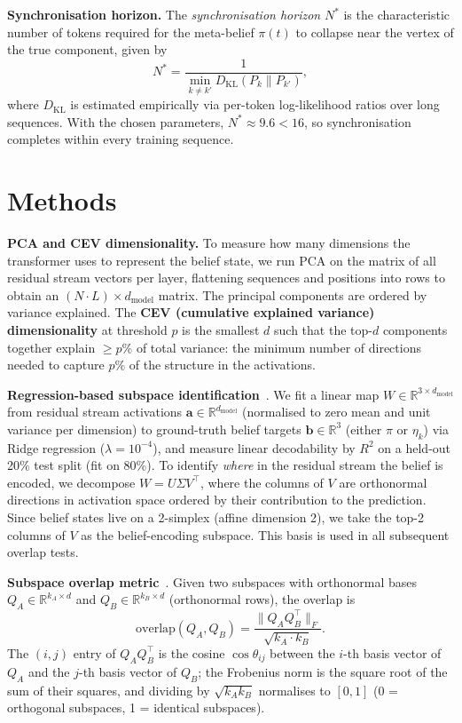 \documentclass{article}
\begin{document}
\textbf{Synchronisation horizon.}
The \emph{synchronisation horizon} $N^*$ is the characteristic number of
tokens required for the meta-belief $\pi(t)$ to collapse near the vertex of
the true component, given by
\[
N^* = \frac{1}{\min_{k \neq k'} D_\mathrm{KL}(P_k \| P_{k'})},
\]
where $D_\mathrm{KL}$ is estimated empirically via per-token log-likelihood
ratios over long sequences.
With the chosen parameters, $N^* \approx 9.6 < 16$, so synchronisation
completes within every training sequence.

\section{Methods}
\label{sec:methods}

\textbf{PCA and CEV dimensionality.}
To measure how many dimensions the transformer uses to represent the belief state,
we run PCA on the matrix of all residual stream vectors per layer, flattening
sequences and positions into rows to obtain an $(N \cdot L) \times d_\mathrm{model}$
matrix.
The principal components are ordered by variance explained.
The \textbf{CEV (cumulative explained variance) dimensionality} at threshold $p$ is
the smallest $d$ such that the top-$d$ components together explain $\geq p\%$ of
total variance: the minimum number of directions needed to capture $p\%$ of the
structure in the activations.

\textbf{Regression-based subspace identification}~\cite{shai2024belief}.
We fit a linear map $W \in \mathbb{R}^{3 \times d_\mathrm{model}}$ from residual
stream activations $\mathbf{a} \in \mathbb{R}^{d_\mathrm{model}}$ (normalised to
zero mean and unit variance per dimension) to ground-truth belief targets
$\mathbf{b} \in \mathbb{R}^3$ (either $\pi$ or $\eta_k$) via Ridge regression
($\lambda = 10^{-4}$), and measure linear decodability by $R^2$ on a held-out
20\% test split (fit on 80\%).
To identify \emph{where} in the residual stream the belief is encoded, we decompose $W = U\Sigma V^\top$, where the columns of $V$ are orthonormal directions
in activation space ordered by their contribution to the prediction.
Since belief states live on a 2-simplex (affine dimension 2), we take the top-2
columns of $V$ as the belief-encoding subspace.
This basis is used in all subsequent overlap tests.

\textbf{Subspace overlap metric}~\cite{shai2025factored}.
Given two subspaces with orthonormal bases $Q_A \in \mathbb{R}^{k_A \times d}$ and
$Q_B \in \mathbb{R}^{k_B \times d}$ (orthonormal rows), the overlap is
\[
  \mathrm{overlap}(Q_A, Q_B) = \frac{\|Q_A Q_B^\top\|_F}{\sqrt{k_A \cdot k_B}}.
\]
The $(i,j)$ entry of $Q_A Q_B^\top$ is the cosine $\cos\theta_{ij}$ between the
$i$-th basis vector of $Q_A$ and the $j$-th basis vector of $Q_B$; the Frobenius
norm is the square root of the sum of their squares, and dividing by $\sqrt{k_A k_B}$ normalises to $[0, 1]$
(0 = orthogonal subspaces, 1 = identical subspaces).
\end{document}
